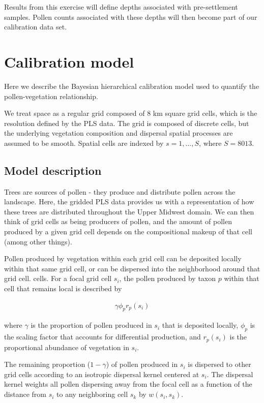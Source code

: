 \documentclass[12pt]{article}
\begin{document}
Results from this exercise will define depths associated with
pre-settlement samples. Pollen counts associated with these depths
will then become part of our calibration data set.

\section{Calibration model}

Here we describe the Bayesian hierarchical calibration model used to quantify the
pollen-vegetation relationship. 

We treat space as a regular grid composed of 8 km square grid cells,
which is the resolution defined by the PLS data. The grid is composed
of discrete cells, but the underlying vegetation composition and
dispersal spatial processes are assumed to be smooth. Spatial cells
are indexed by $s=1,\ldots,S$, where $S=8013$.

\subsection{Model description}

Trees are sources of pollen - they produce and distribute pollen
across the landscape. Here, the gridded PLS data provides us with a
representation of how these trees are distributed throughout the Upper
Midwest domain. We can then think of grid cells as being producers of
pollen, and the amount of pollen produced by a given grid cell
depends on the compositional makeup of that cell (among other things). 

Pollen produced by vegetation within each grid cell can be deposited
locally within that same grid cell, or can be dispersed into the neighborhood around that grid cell.
cells. For a focal grid cell $s_i$, the pollen produced by taxon
$p$ within that cell that remains local is described by

\begin{align}
\gamma \phi_p r_p(s_i)
\end{align} 

where $\gamma$ is the proportion of pollen produced in $s_i$ that is deposited locally,
$\phi_p$ is the scaling factor that accounts for differential
production, and $r_p(s_i)$ is the proportional abundance of vegetation
in $s_i$.

The remaining proportion ($1-\gamma$) of pollen produced in $s_i$ is
dispersed to other grid cells according to an isotropic dispersal
kernel centered at $s_i$. The dispersal kernel weights all pollen
dispersing away from the focal cell as a function of the distance from
$s_i$ to any neighboring cell $s_k$ by $w(s_i, s_k)$. 
\end{document}
